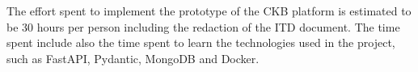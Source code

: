 The effort spent to implement the prototype of the CKB platform is estimated to be 30 hours per person including the redaction of the ITD document.
The time spent include also the time spent to learn the technologies used in the project, such as FastAPI, Pydantic, MongoDB and Docker. \\
